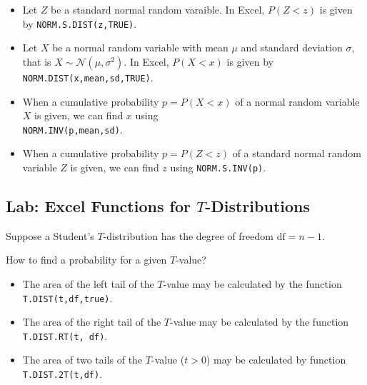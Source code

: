 \begin{itemize}
\item
  Let \(Z\) be a standard normal random varaible. In Excel, \(P(Z<z)\)
  is given by \texttt{NORM.S.DIST(z,TRUE)}.
\item
  Let \(X\) be a normal random variable with mean \(\mu\) and standard
  deviation \(\sigma\), that is \(X\sim \mathcal{N}(\mu, \sigma^2)\). In
  Excel, \(P(X<x)\) is given by \texttt{NORM.DIST(x,mean,sd,TRUE)}.
\item
  When a cumulative probability \(p=P(X<x)\) of a normal random variable
  \(X\) is given, we can find \(x\) using\\ \texttt{NORM.INV(p,mean,sd)}.
\item
  When a cumulative probability \(p=P(Z<z)\) of a standard normal random
  variable \(Z\) is given, we can find \(z\) using
  \texttt{NORM.S.INV(p)}.
\end{itemize}

\hypertarget{lab-excel-functions-for-t-distributions}{%
\subsection{\texorpdfstring{Lab: Excel Functions for
\(T\)-Distributions}{Lab: Excel Functions for T-Distributions}}\label{lab-excel-functions-for-t-distributions}}

Suppose a Student's \(T\)-distribution has the degree of freedom
\(\text{df}=n-1\).

How to find a probability for a given \(T\)-value?

\begin{itemize}
  \item
    The area of the left tail of the \(T\)-value may be calculated by
    the function \texttt{T.DIST(t,df,true)}.
  \item
    The area of the right tail of the \(T\)-value may be calculated by
    the function \texttt{T.DIST.RT(t,\ df)}.
  \item
    The area of two tails of the \(T\)-value
    (\(t > 0\)) may be calculated by
    function \texttt{T.DIST.2T(t,df)}.
  \end{itemize}
  
  

